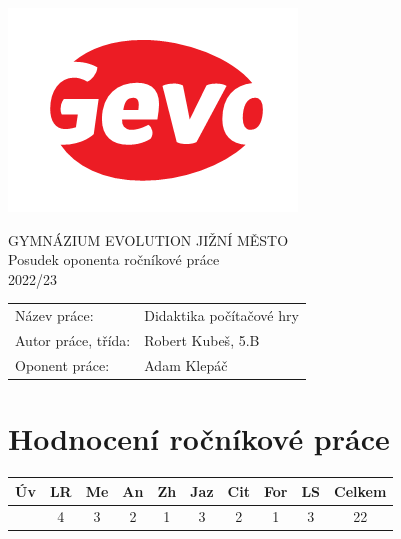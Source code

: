 \documentclass[a4paper,10pt]{article}
\begin{document}
\thispagestyle{fancy}
\begin{minipage}{.3\textwidth}
 \includegraphics[width=\textwidth]{logo}
\end{minipage}
\hfill
\begin{minipage}{.69\textwidth}
 \centering
 \Large{\sffamily
  GYMNÁZIUM EVOLUTION JIŽNÍ MĚSTO\\
  Posudek oponenta ročníkové práce\\
  2022/23
 }
\end{minipage}

\begin{center}
 \large{
 \begin{tabular}{ll}
  \textsf{Název práce:} &
  \textsf{
   Didaktika počítačové hry
  }\\
  \textsf{Autor práce, třída:} &
  \textsf{
   Robert Kubeš, 5.B
  }\\
  \textsf{Oponent práce:} &
  \textsf{
   Adam Klepáč
  }
 \end{tabular}
 }
\end{center}

\section*{\sffamily \centering Hodnocení ročníkové práce}

\begin{center}
 \begin{tabular}{c|c|c|c|c|c|c|c|c|c}
  \sffamily
  Úv & LR & Me & An & Zh & Jaz & Cit & For & LS & Celkem\\
  \toprule
  \normalfont
  3
  &
  4
  &
  3
  &
  2
  &
  1
  &
  3
  &
  2
  &
  1
  &
  3
  &
  22
\end{tabular}
\end{center}
\end{document}
